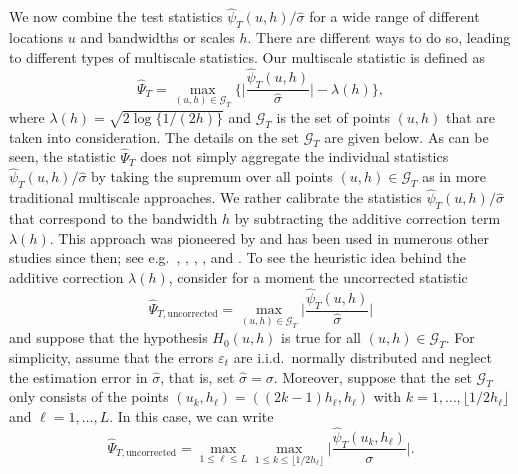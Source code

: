 We now combine the test statistics $\widehat{\psi}_T(u,h)/\widehat{\sigma}$ for a wide range of different locations $u$ and bandwidths or scales $h$. There are different ways to do so, leading to different types of multiscale statistics. Our multiscale statistic is defined as
\begin{equation}\label{multiscale-stat}
\widehat{\Psi}_T = \max_{(u,h) \in \mathcal{G}_T} \Big\{ \Big|\frac{\widehat{\psi}_T(u,h)}{\widehat{\sigma}}\Big| - \lambda(h) \Big\}, 
\end{equation} 
where $\lambda(h) = \sqrt{2 \log \{ 1/(2h) \}}$ and $\mathcal{G}_T$ is the set of points $(u,h)$ that are taken into consideration. The details on the set $\mathcal{G}_T$ are given below. As can be seen, the statistic $\widehat{\Psi}_T$ does not simply aggregate the individual statistics $\widehat{\psi}_T(u,h)/\widehat{\sigma}$ by taking the supremum over all points $(u,h) \in \mathcal{G}_T$ as in more traditional multiscale approaches. We rather calibrate the statistics $\widehat{\psi}_T(u,h)/\widehat{\sigma}$ that correspond to the bandwidth $h$ by subtracting the additive correction term $\lambda(h)$. This approach was pioneered by \cite{DuembgenSpokoiny2001} and has been used in numerous other studies since then; see e.g.\ \cite{Duembgen2002}, \cite{Rohde2008}, \cite{DuembgenWalther2008}, \cite{RufibachWalther2010}, \cite{SchmidtHieber2013} and \cite{EckleBissantzDette2017}. 
To see the heuristic idea behind the additive correction $\lambda(h)$, consider for a moment the uncorrected statistic
\[ \widehat{\Psi}_{T,\text{uncorrected}} = \max_{(u,h) \in \mathcal{G}_T} \Big|\frac{\widehat{\psi}_T(u,h)}{\widehat{\sigma}}\Big| \]
and suppose that the hypothesis $H_0(u,h)$ is true for all $(u,h) \in \mathcal{G}_T$. For simplicity, assume that the errors $\varepsilon_t$ are i.i.d.\ normally distributed and neglect the estimation error in $\widehat{\sigma}$, that is, set $\widehat{\sigma} = \sigma$. Moreover, suppose that the set $\mathcal{G}_T$ only consists of the points $(u_k,h_\ell) = ((2k - 1)h_\ell,h_\ell)$ with $k = 1,\ldots,\lfloor 1/2h_\ell \rfloor$ and $\ell = 1,\ldots,L$. In this case, we can write
\[ \widehat{\Psi}_{T,\text{uncorrected}} = \max_{1 \le \ell \le L} \max_{1 \le k \le \lfloor 1/2h_\ell \rfloor} \Big|\frac{\widehat{\psi}_T(u_k,h_\ell)}{\sigma}\Big|. \]
